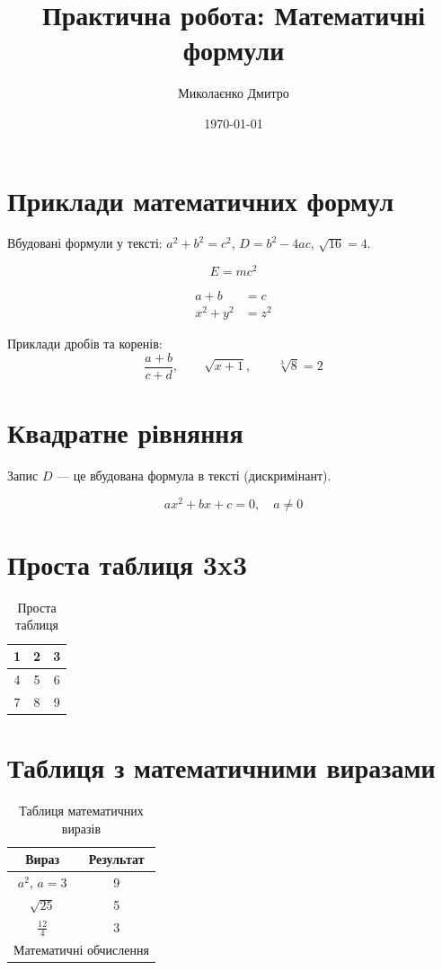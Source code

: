 \documentclass[12pt]{article}
\title{Практична робота: Математичні формули}
\author{Миколаєнко Дмитро}
\date{\today}
\begin{document}
\maketitle

\section*{Приклади математичних формул}

Вбудовані формули у тексті: $a^2+b^2=c^2$, $D=b^2-4ac$, $\sqrt{16}=4$.

\begin{equation}
E=mc^2
\end{equation}

\begin{align}
a+b &= c\\
x^2+y^2 &= z^2
\end{align}

Приклади дробів та коренів:
\[
\frac{a+b}{c+d}, \qquad \sqrt{x+1}, \qquad \sqrt[3]{8}=2
\]

\section*{Квадратне рівняння}



Запис $D$ --- це вбудована формула в тексті (дискримінант).

\begin{equation}
ax^2+bx+c=0,\quad a\neq0
\end{equation}

\section*{Проста таблиця 3x3}

\begin{table}[h]
\centering
\begin{tabular}{|c|c|c|}
\hline
1 & 2 & 3\\
\hline
4 & 5 & 6\\
\hline
7 & 8 & 9\\
\hline
\end{tabular}
\caption{Проста таблиця}
\end{table}

\section*{Таблиця з математичними виразами}

\begin{table}[h]
\centering
\renewcommand{\arraystretch}{1.3}
\begin{tabular}{|c|c|}
\hline
Вираз & Результат\\
\hline
$a^2$, $a=3$ & 9\\
\hline
$\sqrt{25}$ & 5\\
\hline
$\frac{12}{4}$ & 3\\
\hline
\multicolumn{2}{|c|}{Математичні обчислення}\\
\hline
\end{tabular}
\caption{Таблиця математичних виразів}
\end{table}
\end{document}
